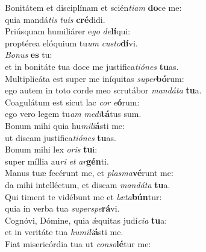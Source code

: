 \evenverse Bonitátem et disciplínam et scién\textit{ti}\textit{am} \textbf{do}ce me:~\*\\
\evenverse quia mandá\textit{tis} \textit{tu}\textit{is} \textbf{cré}didi.\\
\oddverse Priúsquam humiliárer e\textit{go} \textit{de}\textbf{lí}qui:~\*\\
\oddverse proptérea elóquium tu\textit{um} \textit{cu}\textit{sto}\textbf{dí}vi.\\
\evenverse \textit{Bo}\textit{nus} \textbf{es} tu:~\*\\
\evenverse et in bonitáte tua doce me justifica\textit{ti}\textit{ó}\textit{nes} \textbf{tu}as.\\
\oddverse Multiplicáta est super me iníquitas \textit{su}\textit{per}\textbf{bó}rum:~\*\\
\oddverse ego autem in toto corde meo scrutábor \textit{man}\textit{dá}\textit{ta} \textbf{tu}a.\\
\evenverse Coagulátum est sicut lac \textit{cor} \textit{e}\textbf{ó}rum:~\*\\
\evenverse ego vero legem tu\textit{am} \textit{me}\textit{di}\textbf{tá}tus sum.\\
\oddverse Bonum mihi quia hu\textit{mi}\textit{li}\textbf{á}sti me:~\*\\
\oddverse ut discam justifica\textit{ti}\textit{ó}\textit{nes} \textbf{tu}as.\\
\evenverse Bonum mihi lex \textit{o}\textit{ris} \textbf{tu}i:~\*\\
\evenverse super míllia au\textit{ri} \textit{et} \textit{ar}\textbf{gén}ti.\\
\oddverse Manus tuæ fecérunt me, et \textit{plas}\textit{ma}\textbf{vé}runt me:~\*\\
\oddverse da mihi intelléctum, et discam \textit{man}\textit{dá}\textit{ta} \textbf{tu}a.\\
\evenverse Qui timent te vidébunt me et \textit{læ}\textit{ta}\textbf{bún}tur:~\*\\
\evenverse quia in verba tua \textit{su}\textit{per}\textit{spe}\textbf{rá}vi.\\
\oddverse Cognóvi, Dómine, quia ǽquitas judí\textit{ci}\textit{a} \textbf{tu}a:~\*\\
\oddverse et in veritáte tua \textit{hu}\textit{mi}\textit{li}\textbf{á}sti me.\\
\evenverse Fiat misericórdia tua ut \textit{con}\textit{so}\textbf{lé}tur me:~\*\\
